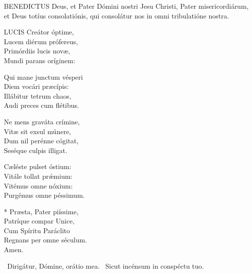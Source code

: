 




\lettrine[lines=2]{B}{ENEDICTUS} Deus, et Pater Dómini nostri Jesu Christi, Pater misericordiárum, et Deus totíus consolatiónis, qui consolátur nos in omni tribulatióne nostra.



\lettrine[lines=2]{L}{UCIS} Creátor óptime,\\
Lucem diérum prófereus,\\
Primórdiis lucis novæ,\\
Mundi parans oríginem:

Qui mane junctum vésperi\\
Diem vocári præcípis:\\
Illábitur tetrum chaos,\\
Audi preces cum flétibus.

Ne mens graváta crímine,\\
Vitæ sit exsul múnere,\\
Dum nil perénne cógitat,\\
Seséque culpis illigat.

Cæléste pulset óstium:\\
Vitále tollat prǽmium:\\
Vitémus omne nóxium:\\
Purgémus omne péssimum.

* Præsta, Pater piíssime,\\
Patríque compar Unice,\\
Cum Spíritu Paráclito\\
Regnans per omne séculum.\\
Amen.

\V\ Dirigátur, Dómine, orátio mea. \R\ Sicut incénsum in conspéctu tuo.



